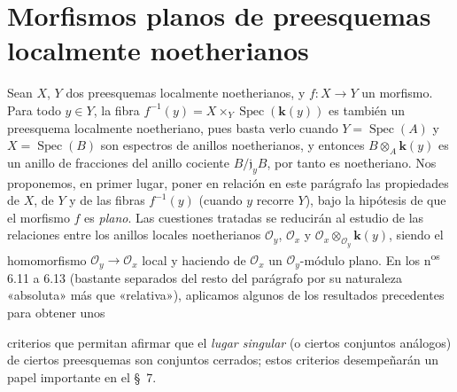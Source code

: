 \section{Morfismos planos de preesquemas localmente noetherianos}

Sean $X$, $Y$ dos preesquemas localmente noetherianos, y $f:X\to Y$ un
morfismo. Para todo $y\in Y$, la fibra
$f^{-1}(y)=X\times_Y\operatorname{Spec}(\boldsymbol{k}(y))$ es también un preesquema
localmente noetheriano, pues basta verlo cuando
$Y=\operatorname{Spec}(A)$ y $X=\operatorname{Spec}(B)$ son espectros de
anillos noetherianos, y entonces $B\otimes_A \boldsymbol{k}(y)$ es un anillo de fracciones
del anillo cociente $B/\mathfrak j_yB$, por tanto es noetheriano. Nos
proponemos, en primer lugar, poner en relación en este parágrafo las propiedades
de $X$, de $Y$ y de las fibras $f^{-1}(y)$ (cuando $y$ recorre $Y$), bajo la
hipótesis de que el morfismo $f$ es \emph{plano}. Las cuestiones tratadas se reducirán
al estudio de las relaciones entre los anillos locales noetherianos
$\mathcal O_y$, $\mathcal O_x$ y
$\mathcal O_x\otimes_{\mathcal O_y}\boldsymbol{k}(y)$, siendo el homomorfismo
$\mathcal O_y\to\mathcal O_x$ local y haciendo de $\mathcal O_x$ un
$\mathcal O_y$-módulo plano. En los n\textsuperscript{os} 6.11 a 6.13
(bastante separados del resto del parágrafo por su naturaleza «absoluta» más
que «relativa»), aplicamos algunos de los resultados precedentes para obtener
unos


criterios que permitan afirmar que el \emph{lugar singular} (o ciertos
conjuntos análogos) de ciertos preesquemas son conjuntos cerrados; estos
criterios desempeñarán un papel importante en el §~7.
